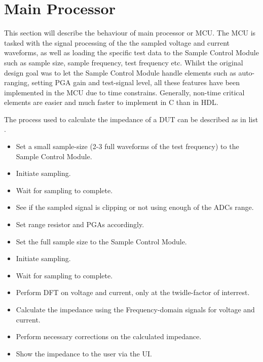 \section{Main Processor} \label{sec:MCU}
This section will describe the behaviour of main processor or MCU. The MCU is tasked with the signal processing of the the sampled voltage and current waveforms, as well as loading the specific test data to the Sample Control Module such as sample size, sample frequency, test frequency etc. Whilst the original design goal was to let the Sample Control Module handle elements such as auto-ranging, setting PGA gain and test-signal level, all these features have been implemented in the MCU due to time constrains. Generally, non-time critical elements are easier and much faster to implement in C than in HDL.

The process used to calculate the impedance of a DUT can be described as in list .
\begin{itemize}
\label{lst_7_3}
    \item Set a small sample-size (2-3 full waveforms of the test frequency) to the Sample Control Module.
    \item Initiate sampling.
    \item Wait for sampling to complete. 
    \item See if the sampled signal is clipping or not using enough of the ADCs range.
    \item Set range resistor and PGAs accordingly.
    \item Set the full sample size to the Sample Control Module.
    \item Initiate sampling.
    \item Wait for sampling to complete. 
    \item Perform DFT on voltage and current, only at the twidle-factor of interrest. 
    \item Calculate the impedance using the Frequency-domain signals for voltage and current. 
    \item Perform necessary corrections on the calculated impedance. 
    \item Show the impedance to the user via the UI.
\end{itemize}

